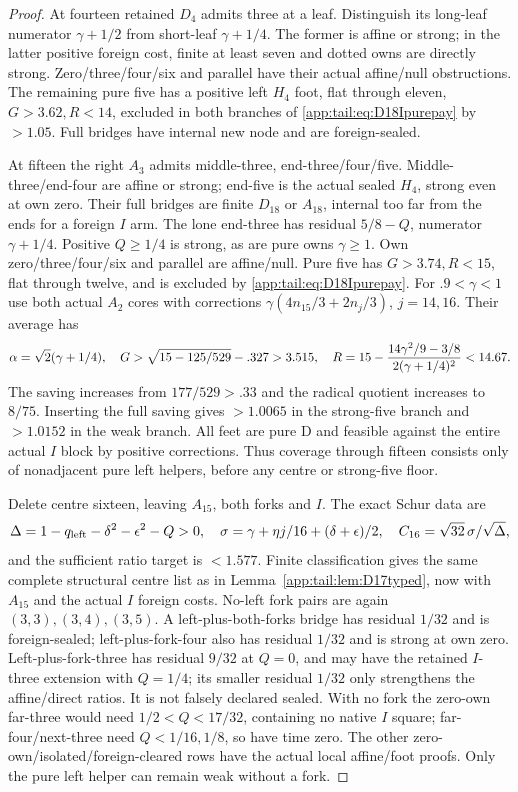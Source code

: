 \documentclass[11pt]{article}
\theoremstyle{definition}
\theoremstyle{remark}
\begin{document}
\begin{proof}
At fourteen retained $D_4$ admits three at a leaf. Distinguish
its long-leaf numerator $\gamma+1/2$ from short-leaf
$\gamma+1/4$. The former is affine or strong; in the latter
positive foreign cost, finite at least seven and dotted owns
are directly strong. Zero/three/four/six and parallel have
their actual affine/null obstructions. The remaining pure
five has a positive left $H_4$ foot, flat through eleven,
$G>3.62,R<14$, excluded in both branches of
\eqref{app:tail:eq:D18Ipurepay} by $>1.05$.
Full bridges have internal new node and are foreign-sealed.

At fifteen the right $A_3$ admits middle-three, end-three/four/five.
Middle-three/end-four are affine or strong; end-five is the
actual sealed $H_4$, strong even at own zero.
Their full bridges are finite $D_{18}$ or $A_{18}$, internal
too far from the ends for a foreign $I$ arm.
The lone end-three has residual $5/8-Q$, numerator
$\gamma+1/4$. Positive $Q\ge1/4$ is strong, as are pure
owns $\gamma\ge1$. Own zero/three/four/six and parallel
are affine/null. Pure five has $G>3.74,R<15$, flat through
twelve, and is excluded by \eqref{app:tail:eq:D18Ipurepay}.
For $.9<\gamma<1$ use both actual $A_2$ cores with corrections
$\gamma(4n_{15}/3+2n_j/3)$, $j=14,16$.
Their average has
\[
 \alpha=\sqrt2(\gamma+1/4),\quad
 G>\sqrt{15-125/529}-.327>3.515,\quad
 R=15-{14\gamma^2/9-3/8\over2(\gamma+1/4)^2}<14.67.
\]
The saving increases from $177/529>.33$ and the radical
quotient increases to $8/75$. Inserting the full saving gives
$>1.0065$ in the strong-five branch and $>1.0152$ in the
weak branch. All feet are pure D and feasible against the
entire actual $I$ block by positive corrections.
Thus coverage through fifteen consists only of nonadjacent
pure left helpers, before any centre or strong-five floor.

Delete centre sixteen, leaving $A_{15}$, both forks and $I$.
The exact Schur data are
\[
 \Delta=1-q_{\rm left}-\delta^2-\epsilon^2-Q>0,
 \quad\sigma=\gamma+\eta j/16+(\delta+\epsilon)/2,
 \quad C_{16}=\sqrt{32}\,\sigma/\sqrt\Delta,
\]
and the sufficient ratio target is $<1.577$.
Finite classification gives the same complete structural centre
list as in Lemma~\ref{app:tail:lem:D17typed}, now with
$A_{15}$ and the actual $I$ foreign costs.
No-left fork pairs are again $(3,3),(3,4),(3,5)$.
A left-plus-both-forks bridge has residual $1/32$ and is
foreign-sealed; left-plus-fork-four also has residual $1/32$
and is strong at own zero. Left-plus-fork-three has residual
$9/32$ at $Q=0$, and may have the retained $I$-three extension
with $Q=1/4$; its smaller residual $1/32$ only strengthens
the affine/direct ratios. It is not falsely declared sealed.
With no fork the zero-own far-three would need
$1/2<Q<17/32$, containing no native $I$ square;
far-four/next-three need $Q<1/16,1/8$, so have time zero.
The other zero-own/isolated/foreign-cleared rows have the
actual local affine/foot proofs. Only the pure left helper
can remain weak without a fork.


\end{proof}
\end{document}
